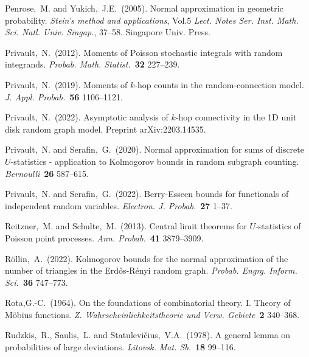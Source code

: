 \documentclass[bj,authoryear,noshowframe]{imsart}
\theoremstyle{plain}
\theoremstyle{remark}
\let\Horig\H
\begin{document}
\begin{thebibliography}{4}
  Penrose,~M. and Yukich,~J.E.~(2005).
  Normal approximation in geometric probability.
  {\em Stein's method and applications}, Vol.5 {\em Lect.
    Notes Ser. Inst. Math. Sci. Natl. Univ. Singap.}, 37--58. Singapore Univ. Press.

  Privault,~N.~(2012).
  Moments of {P}oisson stochastic integrals with random integrands.
  \textit{Probab. Math. Statist.}~\textbf{32} 227--239.

  Privault,~N.~(2019).
  Moments of $k$-hop counts in the random-connection model.
  \textit{J. Appl. Probab.}~\textbf{56} 1106--1121.

  Privault,~N.~(2022).
  Asymptotic analysis of $k$-hop connectivity in the 1{D} unit disk random graph model.
  Preprint arXiv:2203.14535.

  Privault,~N. and Serafin,~G.~(2020).
  Normal approximation for sums of discrete $U$-statistics -
  application to {K}olmogorov bounds in random subgraph counting.
  \textit{Bernoulli}~\textbf{26} 587--615.

  Privault,~N. and Serafin,~G.~(2022).
  Berry-{E}sseen bounds for functionals of independent random variables.
  \textit{Electron. J. Probab.}~\textbf{27} 1--37.

  Reitzner,~M. and Schulte,~M.~(2013).
  Central limit theorems for ${U}$-statistics of {P}oisson point processes.
  \textit{Ann. Probab.}~\textbf{41} 3879--3909.

  R{\"o}llin,~A.~(2022).
  Kolmogorov bounds for the normal approximation of the number of triangles in the {E}rd{\Horig{o}}s-{R}\'enyi random graph.
  \textit{Probab. Engrg. Inform. Sci.}~\textbf{36} 747--773.

  Rota,G.-C.~(1964).
  On the foundations of combinatorial theory. {I}. Theory of {M}\"obius functions.
  {\em Z. Wahrscheinlichkeitstheorie und Verw. Gebiete}~\textbf{2} 340--368.

  Rudzkis,~R., Saulis,~L. and Statulevi\v{c}ius,~V.A.~(1978).
  A general lemma on probabilities of large deviations.
  \textit{Litovsk. Mat. Sb.}~\textbf{18} 99--116.


\end{thebibliography}
\end{document}
